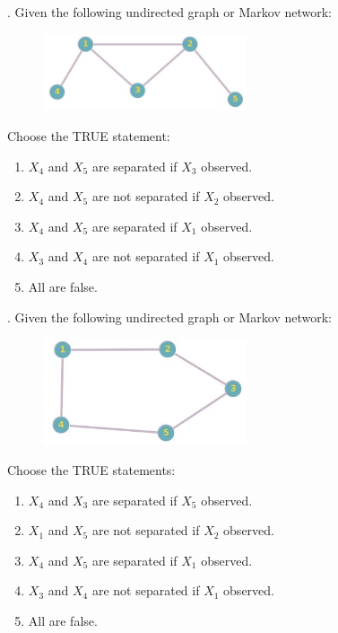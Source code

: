 \newpage
{}. Given the following undirected graph or Markov network:

\begin{figure}[h]
    \centering
    \includegraphics[width=6cm]{Images/undirected-exercise.jpg}
    \label{fig:exercise-markov}
\end{figure}

\noindent Choose the TRUE statement:

\begin{enumerate}[label=\roman*]
    \item $X_4$ and $X_5$ are separated if $X_3$ observed.
    \item $X_4$ and $X_5$ are not separated if $X_2$ observed.
    \item $X_4$ and $X_5$ are separated if $X_1$ observed.
    \item $X_3$ and $X_4$ are not separated if $X_1$ observed.
    \item All are false.
\end{enumerate}

. Given the following undirected graph or Markov network:

\begin{figure}[h]
    \centering
    \includegraphics[width=6cm]{Images/undirected-exercise2.jpg}
    \label{fig:exercise-markov}
\end{figure}

\noindent Choose the TRUE statements:

\begin{enumerate}[label=\roman*]
    \item $X_4$ and $X_3$ are separated if $X_5$ observed.
    \item $X_1$ and $X_5$ are not separated if $X_2$ observed.
    \item $X_4$ and $X_5$ are separated if $X_1$ observed.
    \item $X_3$ and $X_4$ are not separated if $X_1$ observed.
    \item All are false.
\end{enumerate}



